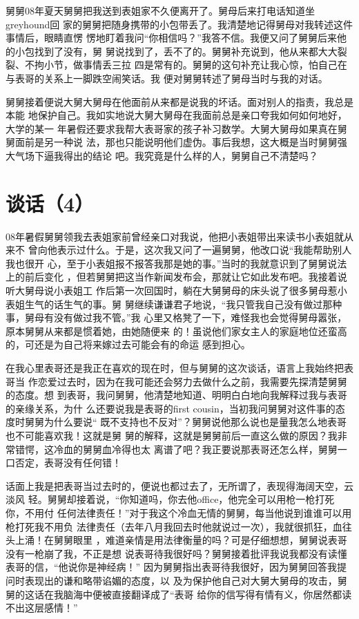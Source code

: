 \documentclass[12pt]{book}
\begin{document}
舅舅08年夏天舅舅把我送到表姐家不久便离开了。舅母后来打电话知道坐greyhound回
家的舅舅把随身携带的小包带丢了。我清楚地记得舅母对我转述这件事情后，眼睛直愣
愣地盯着我问“你相信吗？”我答不信。我便又问了舅舅后来他的小包找到了没有，舅
舅说找到了，丢不了的。舅舅补充说到，他从来都大大裂裂、不拘小节，做事情丢三拉
四是常有的。舅舅的这句补充让我心惊，怕自己在与表哥的关系上一脚跌空闹笑话。我
便对舅舅转述了舅母当时与我的对话。

舅舅接着便说大舅大舅母在他面前从来都是说我的坏话。面对别人的指责，我总是本能
地保护自己。我如实地说大舅大舅母在我面前总是亲口夸我如何如何地好，大学的某一
年暑假还要求我帮大表哥家的孩子补习数学。大舅大舅母如果真在舅舅面前是另一种说
法，那也只能说明他们虚伪。事后我想，这大概是当时舅舅强大气场下逼我得出的结论
吧。我究竟是什么样的人，舅舅自己不清楚吗？
\section{谈话（4）}
\label{sec-9-76}

08年暑假舅舅领我去表姐家前曾经亲口对我说，他把小表姐带出来读书小表姐就从来不
曾向他表示过什么。于是，这次我又问了一遍舅舅，他改口说“我能帮助别人我也很开
心，至于小表姐报不报答我那是她的事。”当时的我就意识到了舅舅说法上的前后变化
，但若舅舅把这当作新闻发布会，那就让它如此发布吧。我接着说听大舅母说小表姐工
作后第一次回国时，躺在大舅舅母的床头说了很多舅母惹小表姐生气的话生气的事。舅
舅继续谦谦君子地说，“我只管我自己没有做过那种事，舅母有没有做过我不管。”我
心里又格凳了一下，难怪我也会觉得舅母嚣张，原本舅舅从来都是惯着她，由她随便来
的！虽说他们家女主人的家庭地位还蛮高的，可还是为自己将来嫁过去可能会有的命运
感到担心。

在我心里表哥还是我正在喜欢的现在时，但与舅舅的这次谈话，语言上我始终把表哥当
作恋爱过去时，因为在我可能还会努力去做什么之前，我需要先探清楚舅舅的态度。想
到表哥，我问舅舅，他清楚地知道、明明白白地向我解释过我与表哥的亲缘关系，为什
么还要说我是表哥的first cousin，当初我问舅舅对这件事的态度时舅舅为什么要说“
既不支持也不反对”？舅舅说他那么说也是量我怎么地表哥也不可能喜欢我！这就是舅
舅的解释，这就是舅舅前后一直这么做的原因？我非常错愕，这冷血的舅舅血冷得也太
离谱了吧？我正要说那表哥还怎么样，舅舅一口否定，表哥没有任何错！

话面上我是把表哥当过去时的，便说也都过去了，无所谓了，表现得海阔天空，云淡风
轻。舅舅却接着说，“你知道吗，你去他office，他完全可以用枪一枪打死你，不用付
任何法律责任！”对于我这个冷血无情的舅舅，每当他说到谁谁可以用枪打死我不用负
法律责任（去年八月我回去时他就说过一次），我就很抓狂，血往头上涌！在舅舅眼里
，难道亲情是用法律衡量的吗？可是仔细想想，舅舅说表哥没有一枪崩了我，不正是想
说表哥待我很好吗？舅舅接着批评我说我都没有读懂表哥的信，“他说你是神经病！”
因为舅舅指出表哥待我很好，因为舅舅回答我提问时表现出的谦和略带谄媚的态度，以
及为保护他自己对大舅大舅母的攻击，舅舅的这话在我脑海中便被直接翻译成了“表哥
给你的信写得有情有义，你居然都读不出这层感情！”
\end{document}

